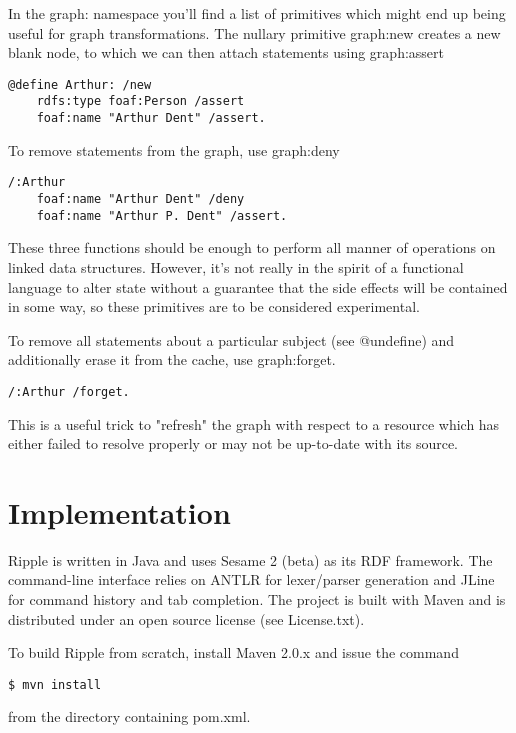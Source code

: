 \documentclass[runningheads]{llncs}
\begin{document}
In the graph: namespace you'll find a list of primitives which might end up being useful for graph transformations.  The nullary primitive graph:new creates a new blank node, to which we can then attach statements using graph:assert

\begin{verbatim}
@define Arthur: /new
    rdfs:type foaf:Person /assert
    foaf:name "Arthur Dent" /assert.
\end{verbatim}

To remove statements from the graph, use graph:deny

\begin{verbatim}
/:Arthur
    foaf:name "Arthur Dent" /deny
    foaf:name "Arthur P. Dent" /assert.
\end{verbatim}

These three functions should be enough to perform all manner of operations on linked data structures.  However, it's not really in the spirit of a functional language to alter state without a guarantee that the side effects will be contained in some way, so these primitives are to be considered experimental.

To remove all statements about a particular subject (see @undefine) and additionally erase it from the cache, use graph:forget.

\begin{verbatim}
/:Arthur /forget.
\end{verbatim}

This is a useful trick to "refresh" the graph with respect to a resource which has either failed to resolve properly or may not be up-to-date with its source.

















\section{Implementation}

Ripple is written in Java and uses Sesame 2 (beta) as its RDF framework.  The
command-line interface relies on ANTLR for lexer/parser generation and JLine for
command history and tab completion.  The project is built with Maven and is
distributed under an open source license (see License.txt).

To build Ripple from scratch, install Maven 2.0.x and issue the command

\begin{verbatim}
$ mvn install
\end{verbatim}

from the directory containing pom.xml.
\end{document}
